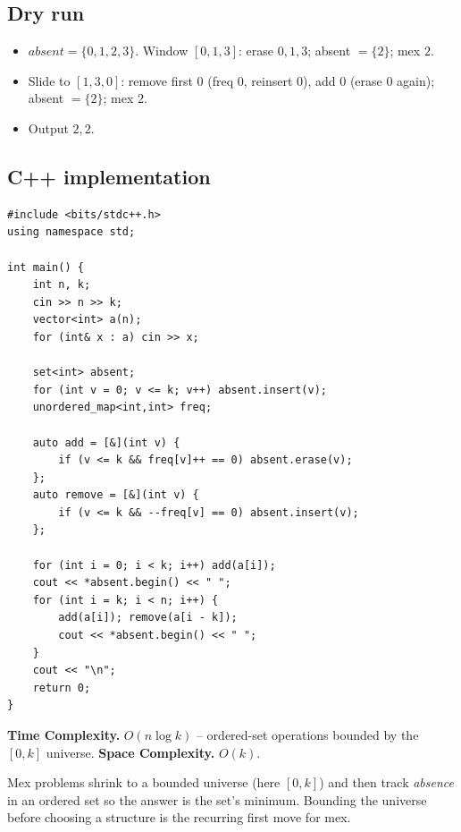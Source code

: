 \subsection*{Dry run}


\begin{itemize}
  \item $\textit{absent}=\{0,1,2,3\}$. Window $[0,1,3]$: erase $0,1,3$;
        absent $=\{2\}$; mex $2$.
  \item Slide to $[1,3,0]$: remove first $0$ (freq $0$, reinsert $0$),
        add $0$ (erase $0$ again); absent $=\{2\}$; mex $2$.
  \item Output $2,2$.
\end{itemize}

\subsection*{C++ implementation}

\begin{lstlisting}
#include <bits/stdc++.h>
using namespace std;

int main() {
    int n, k;
    cin >> n >> k;
    vector<int> a(n);
    for (int& x : a) cin >> x;

    set<int> absent;
    for (int v = 0; v <= k; v++) absent.insert(v);
    unordered_map<int,int> freq;

    auto add = [&](int v) {
        if (v <= k && freq[v]++ == 0) absent.erase(v);
    };
    auto remove = [&](int v) {
        if (v <= k && --freq[v] == 0) absent.insert(v);
    };

    for (int i = 0; i < k; i++) add(a[i]);
    cout << *absent.begin() << " ";
    for (int i = k; i < n; i++) {
        add(a[i]); remove(a[i - k]);
        cout << *absent.begin() << " ";
    }
    cout << "\n";
    return 0;
}
\end{lstlisting}

\begin{complexitybox}
\textbf{Time Complexity.} $O(n\log k)$ -- ordered-set operations bounded by
the $[0,k]$ universe. \textbf{Space Complexity.} $O(k)$.
\end{complexitybox}

\begin{takeawaybox}
Mex problems shrink to a bounded universe (here $[0,k]$) and then track
\emph{absence} in an ordered set so the answer is the set's minimum. Bounding
the universe before choosing a structure is the recurring first move for
mex.
\end{takeawaybox}
